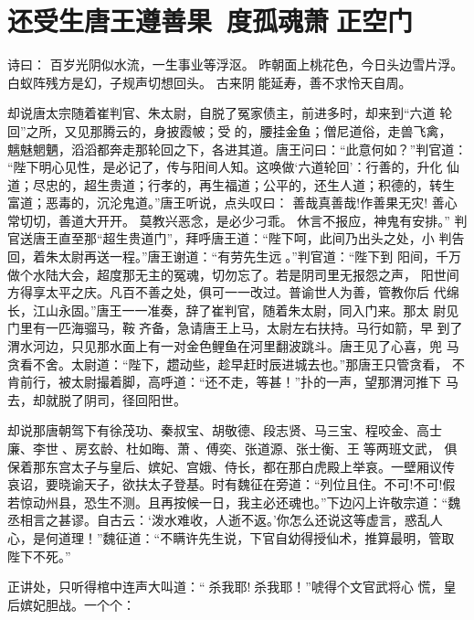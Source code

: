 \chapter{还受生唐王遵善果~度孤魂萧正空门}

诗曰：
百岁光阴似水流，一生事业等浮沤。
昨朝面上桃花色，今日头边雪片浮。
白蚁阵残方是幻，子规声切想回头。
古来阴能延寿，善不求怜天自周。

却说唐太宗随着崔判官、朱太尉，自脱了冤家债主，前进多时，却来到“六道
轮回”之所，又见那腾云的，身披霞帔；受的，腰挂金鱼；僧尼道俗，走兽飞禽，
魑魅魍魉，滔滔都奔走那轮回之下，各进其道。唐王问曰：“此意何如？”判官道：
“陛下明心见性，是必记了，传与阳间人知。这唤做‘六道轮回’：行善的，升化
仙道；尽忠的，超生贵道；行孝的，再生福道；公平的，还生人道；积德的，转生
富道；恶毒的，沉沦鬼道。”唐王听说，点头叹曰：
善哉真善哉!作善果无灾!
善心常切切，善道大开开。
莫教兴恶念，是必少刁乖。
休言不报应，神鬼有安排。”
判官送唐王直至那“超生贵道门”，拜呼唐王道：“陛下呵，此间乃出头之处，小
判告回，着朱太尉再送一程。”唐王谢道：“有劳先生远。”判官道：“陛下到
阳间，千万做个水陆大会，超度那无主的冤魂，切勿忘了。若是阴司里无报怨之声，
阳世间方得享太平之庆。凡百不善之处，俱可一一改过。普谕世人为善，管教你后
代绵长，江山永固。”唐王一一准奏，辞了崔判官，随着朱太尉，同入门来。那太
尉见门里有一匹海骝马，鞍齐备，急请唐王上马，太尉左右扶持。马行如箭，早
到了渭水河边，只见那水面上有一对金色鲤鱼在河里翻波跳斗。唐王见了心喜，兜
马贪看不舍。太尉道：“陛下，趱动些，趁早赶时辰进城去也。”那唐王只管贪看，
不肯前行，被太尉撮着脚，高呼道：“还不走，等甚！”扑的一声，望那渭河推下
马去，却就脱了阴司，径回阳世。

却说那唐朝驾下有徐茂功、秦叔宝、胡敬德、段志贤、马三宝、程咬金、高士
廉、李世、房玄龄、杜如晦、萧、傅奕、张道源、张士衡、王等两班文武，
俱保着那东宫太子与皇后、嫔妃、宫娥、侍长，都在那白虎殿上举哀。一壁厢议传
哀诏，要晓谕天子，欲扶太子登基。时有魏征在旁道：“列位且住。不可!不可!假
若惊动州县，恐生不测。且再按候一日，我主必还魂也。”下边闪上许敬宗道：“魏
丞相言之甚谬。自古云：‘泼水难收，人逝不返。’你怎么还说这等虚言，惑乱人
心，是何道理！”魏征道：“不瞒许先生说，下官自幼得授仙术，推算最明，管取
陛下不死。”

正讲处，只听得棺中连声大叫道：“杀我耶!杀我耶！”唬得个文官武将心
慌，皇后嫔妃胆战。一个个：

